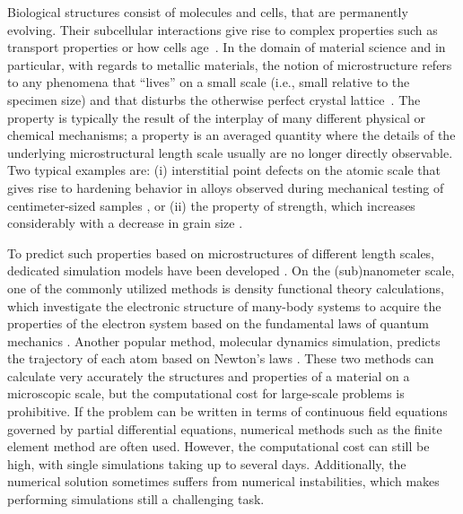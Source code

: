 \documentclass[11pt, authoryear]{elsarticle}
\begin{document}
	Biological structures consist of molecules and cells, that are 
	permanently evolving. Their subcellular interactions give rise to complex properties such as transport properties or how cells age~\citep{Li2021}.
	In the domain of  material science and in particular, with regards to metallic 
	materials, the notion of microstructure refers to any phenomena that ``lives'' 
	on a small scale (i.e., small relative to the specimen size) and that disturbs 
	the otherwise perfect crystal lattice~\citep{callister2007materials}. 
	The property is typically the result of the interplay of many different
	physical or chemical mechanisms; a property is an averaged quantity where
	the details of the underlying microstructural length scale usually are no longer
	directly observable. Two typical examples are: (i) interstitial point defects on 
	the atomic scale that gives rise to hardening behavior in alloys observed 
	during mechanical testing of centimeter-sized samples 
	\citep{baker2022interstitial}, or (ii) the property of strength, which 
	increases considerably with a decrease in grain size \citep{opiela2020effect}.	
	
	To predict such properties based on microstructures of different length
	scales, dedicated simulation models have been developed  \citep{nguyen2023challenges,seif2023application,sharma2023multiphysics}. 
	On the (sub)nanometer scale, one of the commonly utilized methods is density 
	functional theory calculations, which investigate the electronic structure of 
	many-body systems to acquire the properties of the electron system based on 
	the fundamental laws of quantum mechanics \citep{dreizler2012density}. 
	Another popular method, molecular dynamics simulation, predicts the trajectory 
	of each atom based on Newton's laws \citep{hospital2015molecular}. These two 
	methods can calculate very accurately the structures and properties of a material
	on a microscopic scale, but the computational cost for large-scale problems is
	prohibitive. If the problem can be written in terms of continuous field
	equations governed by partial differential equations, numerical methods 
	such as the finite element method \citep{huebner2001finite} are often used. 
	However, the computational cost can still be high, with single simulations
	taking up to several days. Additionally, the numerical solution sometimes 
	suffers from numerical instabilities, which makes performing simulations still 
	a challenging task.
	
\end{document}

